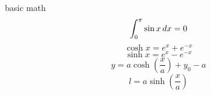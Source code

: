 \documentclass{article}
\begin{document}
basic math
$$ \int_0^\pi \sin x \mathop{dx} = 0 $$
\begin{equation}
    \cosh x = e^{x} + e^{-x}
\end{equation}
\begin{equation}
    \sinh x = e^{x} - e^{-x}
\end{equation}
\begin{equation}
    y = a \cosh(\frac{x}{a}) + y_0 - a
\end{equation}
\begin{equation}
    l = a \sinh(\frac{x}{a})
\end{equation}
\end{document}
